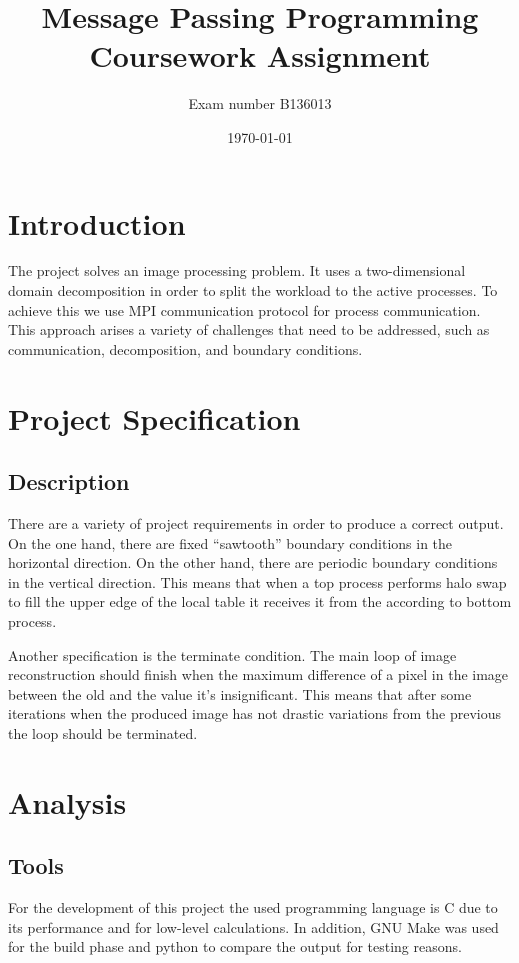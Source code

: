\documentclass[12pt,a4paper]{article}
\newcommand{\sectionVspacing}{\vspace{15pt}}
\begin{document}
\title{Message Passing Programming Coursework Assignment}
\author{Exam number B136013}
\date{\today}

\makeEPCCtitle

\thispagestyle{empty}

\newpage
\clearpage

\tableofcontents

\newpage
\clearpage

\section{Introduction}
The project solves an image processing problem. It uses a two-dimensional domain decomposition in order to split the workload to the active processes. To achieve this we use MPI communication protocol for process communication. This approach arises a variety of challenges that need to be addressed, such as communication, decomposition, and boundary conditions.

\sectionVspacing

\section{Project Specification}
\subsection{Description}
There are a variety of project requirements in order to produce a correct output. On the one hand, there are fixed “sawtooth” boundary conditions in the horizontal direction. On the other hand, there are periodic boundary conditions in the vertical direction. This means that when a top process performs halo swap to fill the upper edge of the local table it receives it from the according to bottom process.

Another specification is the terminate condition. The main loop of image reconstruction should finish when the maximum difference of a pixel in the image between the old and the value it's insignificant. This means that after some iterations when the produced image has not drastic variations from the previous the loop should be terminated.

\sectionVspacing

\section{Analysis}

    \subsection{Tools}
    For the development of this project the used programming language is C due to its performance and for low-level calculations. In addition, GNU Make was used for the build phase and python to compare the output for testing reasons.
\end{document}
